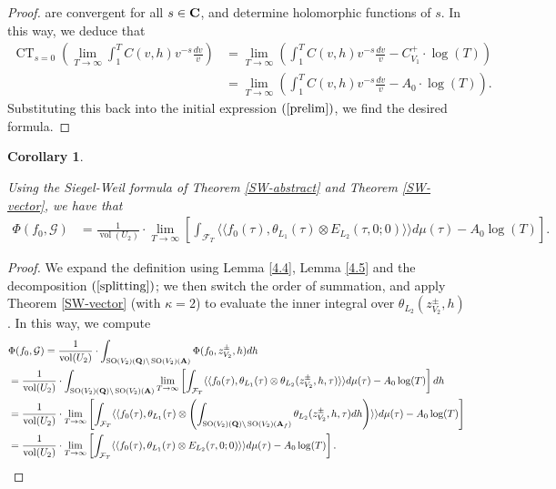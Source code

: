 \documentclass{amsart}
\newtheorem{corollary}[theorem]{Corollary}
\theoremstyle{definition}
\begin{document}
\begin{proof}
are convergent for all $s \in {\bf{C}}$, and determine holomorphic functions of $s$. In this way, we deduce that 
\begin{align*} \operatorname{CT}_{s=0} \left( \lim_{T \rightarrow \infty} \int_1^T C(v, h) v^{-s} \frac{dv}{v} \right)
&= \lim_{T \rightarrow \infty} \left( \int_1^T C(v, h) v^{-s} \frac{dv}{v} - C^+_{V_1} \cdot \log(T)  \right) \\
&= \lim_{T \rightarrow \infty} \left( \int_1^T C(v, h) v^{-s} \frac{dv}{v} - A_0 \cdot \log(T)  \right). \end{align*}
Substituting this back into the initial expression $(\ref{prelim})$, we find the desired formula. \end{proof}

\begin{corollary}\label{4.6} 

Using the Siegel-Weil formula of Theorem \ref{SW-abstract} and Theorem \ref{SW-vector}, we have that 
\begin{align*} \Phi(f_0, \mathcal{G}) &= \frac{1}{ \operatorname{vol}(U_2) } \cdot \lim_{T \rightarrow \infty} \left[
 \int_{ \mathcal{F}_T } \langle \langle f_0 (\tau), \theta_{L_1}(\tau) \otimes E_{L_2}(\tau, 0; 0) \rangle \rangle d \mu(\tau) 
- A_0 \log(T) \right]. \end{align*}  \end{corollary}

\begin{proof} 

We expand the definition using Lemma \ref{4.4}, Lemma \ref{4.5} and the decomposition $(\ref{splitting})$;
we then switch the order of summation, and apply Theorem \ref{SW-vector} (with $\kappa =2$) 
to evaluate the inner integral over $\theta_{L_2}(z_{V_2}^{\pm}, h)$. In this way, we compute 
\begin{equation*}\begin{aligned} &\Phi( f_0, \mathcal{G}) = \frac{1}{ \operatorname{vol}(U_2)} \cdot 
\int_{ \operatorname{SO}(V_2)({\bf{Q}}) \backslash \operatorname{SO}(V_2)({\bf{A}}) } \Phi(f_0, z_{V_2}^{\pm}, h) dh \\
&= \frac{1}{ \operatorname{vol}(U_2)} \cdot \int_{ \operatorname{SO}(V_2)({\bf{Q}}) \backslash \operatorname{SO}(V_2)({\bf{A}}) }
\lim_{T \rightarrow \infty} \left[ \int_{\mathcal{F}_T} 
\langle \langle f_0(\tau), \theta_{L_1}(\tau) \otimes \theta_{L_2}(z_{V_2}^{\pm}, h, \tau) \rangle \rangle d\mu(\tau) - A_0 \log(T) \right] dh \\
&= \frac{1}{ \operatorname{vol}(U_2)} \cdot \lim_{T \rightarrow \infty} \left[
\int_{\mathcal{F}_T}  \langle \langle f_0(\tau), \theta_{L_1}(\tau) \otimes 
\left( \int_{ \operatorname{SO}(V_2)({\bf{Q}}) \backslash \operatorname{SO}(V_2)({\bf{A}}_f) }
\theta_{L_2}(z_{V_2}^{\pm}, h, \tau) dh \right) \rangle \rangle d\mu(\tau) - A_0 \log(T) \right] \\
&= \frac{1}{ \operatorname{vol}(U_2)} \cdot \lim_{T \rightarrow \infty} \left[
 \int_{\mathcal{F}_T}   \langle \langle f_0(\tau), \theta_{L_1}(\tau) \otimes E_{L_2}(\tau, 0; 0) \rangle \rangle d\mu(\tau) - A_0 \log(T) \right]. 
\end{aligned}\end{equation*} \end{proof}
\end{document}
